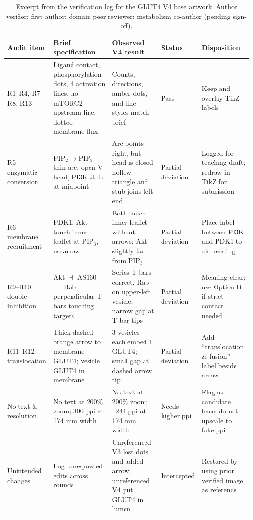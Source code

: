 \begin{table}[htbp]\centering\scriptsize
\setlength{\tabcolsep}{3pt}
\renewcommand{\arraystretch}{1.1}
\caption{Excerpt from the verification log for the GLUT4 V4 base artwork. Author verifier: first author; domain peer reviewer: metabolism co-author (pending sign-off).}\label{tab:ch07-verify}
\begin{tabularx}{\linewidth}{lYYYY}
\toprule
\textbf{Audit item} & \textbf{Brief specification} & \textbf{Observed V4 result} & \textbf{Status} & \textbf{Disposition} \\
\midrule
R1--R4, R7--R8, R13 & Ligand contact, phosphorylation dots, 4 activation lines, no mTORC2 upstream line, dotted membrane flux & Counts, directions, amber dots, and line styles match brief & Pass & Keep and overlay TikZ labels \\
R5 enzymatic conversion & $\text{PIP}_2 \rightarrow \text{PIP}_3$ thin arc, open V head, PI3K stub at midpoint & Arc points right, but head is closed hollow triangle and stub joins left end & Partial deviation & Logged for teaching draft; redraw in TikZ for submission \\
R6 membrane recruitment & PDK1, Akt touch inner leaflet at $\text{PIP}_3$, no arrow & Both touch inner leaflet without arrows; Akt slightly far from $\text{PIP}_3$ & Partial deviation & Place label between PI3K and PDK1 to aid reading \\
R9--R10 double inhibition & Akt $\dashv$ AS160 $\dashv$ Rab perpendicular T-bars touching targets & Series T-bars correct, Rab on upper-left vesicle; narrow gap at T-bar tips & Partial deviation & Meaning clear; use Option B if strict contact needed \\
R11--R12 translocation & Thick dashed orange arrow to membrane GLUT4; vesicle GLUT4 in membrane & 3 vesicles each embed 1 GLUT4; small gap at dashed arrow tip & Partial deviation & Add ``translocation \& fusion'' label beside arrow \\
No-text \& resolution & No text at 200\% zoom; 300 ppi at 174 mm width & No text at 200\% zoom; ~244 ppi at 174 mm width & Needs higher ppi & Flag as candidate base; do not upscale to fake ppi \\
Unintended changes & Log unrequested edits across rounds & Unreferenced V3 lost dots and added arrow; unreferenced V4 put GLUT4 in lumen & Intercepted & Restored by using prior verified image as reference \\
\bottomrule
\end{tabularx}
\end{table}

